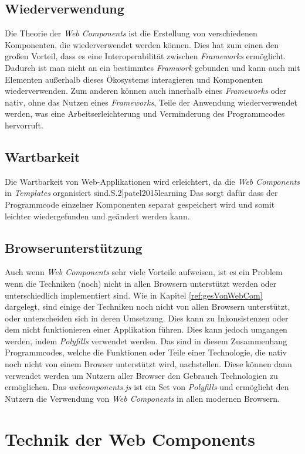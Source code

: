 \documentclass[12pt, paper=a4, bibtotoc, toc=listof, headsepline=true]{scrreprt}
\renewcommand{\smfootcite}[2][2]{\relax}
\begin{document}
		\subsection{Wiederverwendung}
		Die Theorie der \emph{Web Components} ist die Erstellung von verschiedenen Komponenten, die wiederverwendet werden können. Dies hat zum einen den großen Vorteil, dass es eine Interoperabilität zwischen \emph{Frameworks} ermöglicht.\cite[S.2]{patel2015learning} Dadurch ist man nicht an ein bestimmtes \emph{Framwork} gebunden und kann auch mit Elementen außerhalb dieses Ökosystems interagieren und Komponenten wiederverwenden. Zum anderen können auch innerhalb eines \emph{Frameworks} oder nativ, ohne das Nutzen eines \emph{Frameworks}, Teile der Anwendung wiederverwendet werden, was eine Arbeitserleichterung und Verminderung des Programmcodes hervorruft. 
		\subsection{Wartbarkeit}
		Die Wartbarkeit von Web-Applikationen wird erleichtert, da die \emph{Web Components} in \emph{Templates} organisiert sind.\smfootcite[ vgl.][S.2]{patel2015learning} Das sorgt dafür dass der Programmcode einzelner Komponenten separat gespeichert wird und somit leichter wiedergefunden und geändert werden kann.
		\subsection{Browserunterstützung}
		Auch wenn \emph{Web Components} sehr viele Vorteile aufweisen, ist es ein Problem wenn die Techniken (noch) nicht in allen Browsern unterstützt werden oder unterschiedlich implementiert sind. Wie in Kapitel \ref{ref:gesVonWebCom} dargelegt, sind einige der Techniken noch nicht von allen Browsern unterstützt, oder unterscheiden sich in deren Umsetzung. Dies kann zu Inkonsistenzen oder dem nicht funktionieren einer Applikation führen. Dies kann jedoch umgangen werden, indem \emph{Polyfills} verwendet werden. Das sind in diesem Zusammenhang Programmcodes, welche die Funktionen oder Teile einer Technologie, die nativ noch nicht von einem Browser unterstützt wird, nachstellen. Diese können dann verwendet werden um Nutzern aller Browser den Gebrauch Technologien zu ermöglichen.\cite[vgl. S.4]{satrom2014building} Das \emph{webcomponents.js} ist ein Set von \emph{Polyfills} und ermöglicht den Nutzern die Verwendung von \emph{Web Components} in allen modernen Browsern.\cite[vgl.]{webComJs}
			
	\section{Technik der Web Components}
\end{document}
